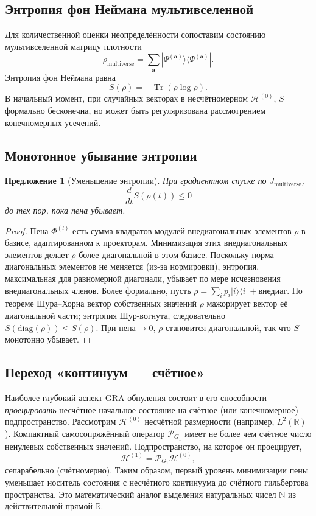 \documentclass[11pt]{article}
\newtheorem{proposition}[theorem]{Предложение}
\DeclareMathOperator{\Tr}{Tr}
\newcommand{\cP}{\mathcal{P}}
\newcommand{\cH}{\mathcal{H}}
\begin{document}
\subsection{Энтропия фон Неймана мультивселенной}
Для количественной оценки неопределённости сопоставим состоянию мультивселенной матрицу плотности
\[
\rho_{\text{multiverse}} = \sum_{\mathbf{a}} |\Psi^{(\mathbf{a})}\rangle \langle \Psi^{(\mathbf{a})}|.
\]
Энтропия фон Неймана равна
\[
S(\rho) = -\Tr(\rho \log \rho).
\]
В начальный момент, при случайных векторах в несчётномерном $\cH^{(0)}$, $S$ формально бесконечна, но может быть регуляризована рассмотрением конечномерных усечений.

\subsection{Монотонное убывание энтропии}
\begin{proposition}[Уменьшение энтропии]
При градиентном спуске по $J_{\text{multiverse}}$,
\[
\frac{d}{dt} S(\rho(t)) \le 0
\]
до тех пор, пока пена убывает.
\end{proposition}
\begin{proof}
Пена $\Phi^{(l)}$ есть сумма квадратов модулей внедиагональных элементов $\rho$ в базисе, адаптированном к проекторам. Минимизация этих внедиагональных элементов делает $\rho$ более диагональной в этом базисе. Поскольку норма диагональных элементов не меняется (из-за нормировки), энтропия, максимальная для равномерной диагонали, убывает по мере исчезновения внедиагональных членов. Более формально, пусть $\rho = \sum_{i} p_i |i\rangle\langle i| + \text{внедиаг}$. По теореме Шура--Хорна вектор собственных значений $\rho$ мажорирует вектор её диагональной части; энтропия Шур-вогнута, следовательно $S(\text{diag}(\rho)) \le S(\rho)$. При $\text{пена} \to 0$, $\rho$ становится диагональной, так что $S$ монотонно убывает.
\end{proof}

\subsection{Переход «континуум --- счётное»}
\label{sec:continuum}
Наиболее глубокий аспект GRA-обнуления состоит в его способности \emph{проецировать} несчётное начальное состояние на счётное (или конечномерное) подпространство. Рассмотрим $\cH^{(0)}$ несчётной размерности (например, $L^2(\mathbb{R})$). Компактный самосопряжённый оператор $\cP_{G_1}$ имеет не более чем счётное число ненулевых собственных значений. Подпространство, на которое он проецирует,
\[
\cH^{(1)} = \cP_{G_1} \cH^{(0)},
\]
сепарабельно (счётномерно). Таким образом, первый уровень минимизации пены уменьшает носитель состояния с несчётного континуума до счётного гильбертова пространства. Это математический аналог выделения натуральных чисел $\mathbb{N}$ из действительной прямой $\mathbb{R}$.
\end{document}
